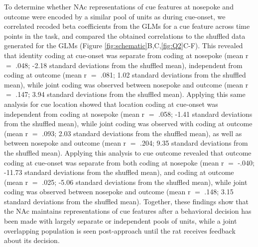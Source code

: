 \documentclass[11pt]{article}
\providecommand{\DIFadd}[1]{{\protect\color{red} \sf #1}} %
\providecommand{\DIFdel}[1]{} %
\providecommand{\DIFaddbegin}{} %
\providecommand{\DIFaddend}{} %
\providecommand{\DIFdelbegin}{} %
\providecommand{\DIFdelend}{} %
\newcommand{\DIFscaledelfig}{0.5}
\newlength{\DIFdelgraphicswidth} %
\newlength{\DIFdelgraphicsheight} %
\newcommand{\DIFaddincludegraphics}[2][]{{\color{red}\fbox{\DIFOincludegraphics[#1]{#2}}}} %
\newcommand{\DIFdelincludegraphics}[2][]{%
\sbox{\DIFdelgraphicsbox}{\DIFOincludegraphics[#1]{#2}}%
\settoboxwidth{\DIFdelgraphicswidth}{\DIFdelgraphicsbox} %
\settoboxtotalheight{\DIFdelgraphicsheight}{\DIFdelgraphicsbox} %
\scalebox{\DIFscaledelfig}{%
\parbox[b]{\DIFdelgraphicswidth}{\usebox{\DIFdelgraphicsbox}\\[-\baselineskip] \rule{\DIFdelgraphicswidth}{0em}}\llap{\resizebox{\DIFdelgraphicswidth}{\DIFdelgraphicsheight}{%
\setlength{\unitlength}{\DIFdelgraphicswidth}%
\begin{picture}(1,1)%
\thicklines\linethickness{2pt} %
{\color[rgb]{1,0,0}\put(0,0){\framebox(1,1){}}}%
{\color[rgb]{1,0,0}\put(0,0){\line( 1,1){1}}}%
{\color[rgb]{1,0,0}\put(0,1){\line(1,-1){1}}}%
\end{picture}%
}\hspace*{3pt}}} %
} %
\DeclareRobustCommand{\DIFaddbegin}{\DIFOaddbegin \let\includegraphics\DIFaddincludegraphics} %
\DeclareRobustCommand{\DIFaddend}{\DIFOaddend \let\includegraphics\DIFOincludegraphics} %
\DeclareRobustCommand{\DIFdelbegin}{\DIFOdelbegin \let\includegraphics\DIFdelincludegraphics} %
\DeclareRobustCommand{\DIFdelend}{\DIFOaddend \let\includegraphics\DIFOincludegraphics} %
\begin{document}
\DIFadd{To determine whether NAc representations of }\DIFaddend cue features at \DIFdelbegin \DIFdel{cue-onset (observed
overlap greater than expected by chance according to chi-square tests), and those
that did not previously have }\DIFdelend \DIFaddbegin \DIFadd{nosepoke and outcome were encoded by a similar pool of units as during cue-onset, we correlated recoded beta coefficients from the GLMs for }\DIFaddend a cue feature \DIFdelbegin \DIFdel{as a predictor (29, 48, and 30 out of 133 cue-modulated units encoded both time points for cue identity , cue location, and cue outcome ,
respectively). Population level averages for units that increased to
cue-onset showed a ramping up of activity that peaked upon nosepoke , whereas
units that decreased to }\DIFdelend \DIFaddbegin \DIFadd{across time points in the task, and compared the obtained correlations to the shuffled data generated for the GLMs (Figure \ref{fig:schematic}B,C,\ref{fig:Q2}C-F). This revealed that identity coding at }\DIFaddend cue-onset \DIFdelbegin \DIFdel{showed a gradual reduction of firing activity
that reached a minimum upon nosepoke (Figure \ref{fig:NP_pop}). Additionally, a
peak is seen for preferred cue outcome in decreasing units at 1 second post
}\DIFdelend \DIFaddbegin \DIFadd{was separate from coding at nosepoke (mean r  $=$ .048; -2.18 standard deviations from the shuffled mean), independent from coding at outcome (mean r  $=$ .081; 1.02 standard deviations from the shuffled mean), while joint coding was observed between nosepoke and outcome (mean r  $=$ .147; 3.94 standard deviations from the shuffled mean). Applying this same analysis for cue location showed that location coding at }\DIFaddend cue-onset \DIFdelbegin \DIFdel{when reward was received, demonstrating an integration of expected and received reward (Figure \ref{fig:NP_pop}F). Furthermore, aligning }\DIFdelend \DIFaddbegin \DIFadd{was independent from coding at nosepoke (mean r  $=$ .058; -1.41 standard deviations from the shuffled mean), while joint coding was observed with coding at outcome (mean r  $=$ .093; 2.03 standard deviations from the shuffled mean), as well as between nosepoke and outcome (mean r  $=$ .204; 9.35 standard deviations from the shuffled mean). Applying this analysis to cue outcome revealed that outcome coding at cue-onset was separate from both coding at nosepoke (mean r  $=$ -.040; -11.73 standard deviations from the shuffled mean), and coding at outcome (mean r  $=$ .025; -5.06 standard deviations from the shuffled mean), while joint coding was observed between nosepoke and outcome (mean r  $=$ .148; 3.15 standard deviations from the shuffled mean). Together, these findings show that the NAc maintains representations of cue features after a behavioral decision has been made with largely separate or independent pools of units, while a joint overlapping population is seen post-approach until the rat receives feedback about its decision.
}
\end{document}
